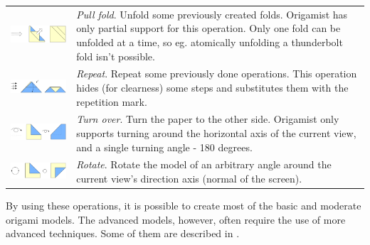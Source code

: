 \begin{savenotes}
\begin{longtable}{lp{5.5cm}}
\includegraphics[width=7.5cm]{images/folds_pull} & \emph{Pull fold}. Unfold some previously created folds. Origamist has only partial support for this operation. Only one fold can be unfolded at a time, so eg. atomically unfolding a thunderbolt fold isn't possible.\\
\includegraphics[width=7.5cm]{images/folds_repeat} & \emph{Repeat}. Repeat some previously done operations. This operation hides (for clearness) some steps and substitutes them with the repetition mark.\\
\includegraphics[width=7.5cm]{images/folds_turn_over} & \emph{Turn over}. Turn the paper to the other side. Origamist only supports turning around the horizontal axis of the current view, and a single turning angle - 180 degrees.\\
\includegraphics[width=7.5cm]{images/folds_rotate} & \emph{Rotate}. Rotate the model of an arbitrary angle around the current view's direction axis (normal of the screen).\\
\end{longtable}
\end{savenotes}

By using these operations, it is possible to create most of the basic and moderate origami models. The advanced models, however, often require the use of more advanced techniques. Some of them are described in \cite{lang}.

